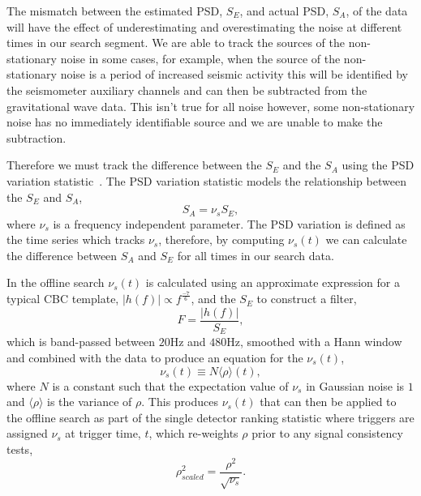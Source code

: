 The mismatch between the estimated PSD, $S_{E}$, and actual PSD, $S_{A}$, of the data will have the effect of underestimating and overestimating the noise at different times in our search segment. We are able to track the sources of the non-stationary noise in some cases, for example, when the source of the non-stationary noise is a period of increased seismic activity this will be identified by the seismometer auxiliary channels and can then be subtracted from the gravitational wave data. This isn't true for all noise however, some non-stationary noise has no immediately identifiable source and we are unable to make the subtraction.

Therefore we must track the difference between the $S_{E}$ and the $S_{A}$ using the PSD variation statistic~\cite{PSD_var:2020}. The PSD variation statistic models the relationship between the $S_{E}$ and $S_{A}$,
%
\begin{equation}
    S_{A} = \nu_{s} S_{E}, 
\end{equation}
%
where $\nu_{s}$ is a frequency independent parameter. The PSD variation is defined as the time series which tracks $\nu_{s}$, therefore, by computing $\nu_{s}(t)$ we can calculate the difference between $S_{A}$ and $S_{E}$ for all times in our search data.

In the offline search $\nu_{s}(t)$ is calculated using an approximate expression for a typical CBC template, $|h(f)| \propto f^{\frac{-7}{6}}$, and the $S_{E}$ to construct a filter,
%
\begin{equation}
    F = \frac{|h(f)|}{S_{E}} ,
    \label{5:eqn:psd-var-filter}
\end{equation}
%
which is band-passed between $20$Hz and $480$Hz, smoothed with a Hann window and combined with the data to produce an equation for the $\nu_{s}(t)$,
%
\begin{equation}
    \nu_{s}(t) \equiv N \langle \rho \rangle(t), 
\end{equation}
%
where $N$ is a constant such that the expectation value of $\nu_{s}$ in Gaussian noise is $1$ and $\langle\rho\rangle$ is the variance of $\rho$. This produces $\nu_{s}(t)$ that can then be applied to the offline search as part of the single detector ranking statistic where triggers are assigned $\nu_{s}$ at trigger time, $t$, which re-weights $\rho$ prior to any signal consistency tests,
%
\begin{equation}
    \rho^{2}_{scaled} = \frac{\rho^{2}}{\sqrt{\nu_{s}}} .
    \label{5:eqn:psd-var-snr-reweighting}
\end{equation}

